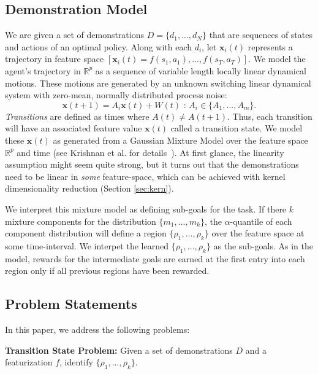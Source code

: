 \subsection{Demonstration Model}
We are given a set of demonstrations $D=\{d_1,...,d_N\}$ that are sequences of states and actions of an optimal policy.
Along with each $d_i$, let $\mathbf{x}_i(t)$ represents a trajectory in feature space $[\mathbf{x}_i(t)= f(s_1,a_1),...,f(s_T,a_T)]$.
We model the agent's trajectory in $\mathbb{R}^p$ as a sequence of variable length locally linear dynamical motions.
These motions are generated by an unknown switching linear dynamical system with zero-mean, normally distributed process noise:
\[
\mathbf{x}(t+1) = A_{i}\mathbf{x}(t) + W(t) \text{ : } A_i \in \{A_1,...,A_m\}.
\]
\emph{Transitions} are defined as times where $A(t) \ne A(t+1)$.
Thus, each transition will have an associated feature value $\mathbf{x}(t)$ called a transition state.
We model these $\mathbf{x}(t)$ as generated from a Gaussian Mixture Model over the feature space $\mathbb{R}^p$ and time (see Krishnan et al. for details~\cite{krishnan2015tsc}).
At first glance, the linearity assumption might seem quite strong, but it turns out that the demonstrations need to be linear in \emph{some} feature-space, which can be achieved with kernel dimensionality reduction (Section \ref{sec:kern}).
 
We interpret this mixture model as defining sub-goals for the task.
If there $k$ mixture components for the distribution $\{m_1,...,m_k\}$, the $\alpha$-quantile of each component distribution will define a region $\{\rho_1,...,\rho_k\}$ over the feature space at some time-interval.
We interpet the learned $\{\rho_1,...,\rho_k\}$ as the sub-goals.
As in the model, rewards for the intermediate goals are earned at the first entry into each region only if all previous regions have been rewarded.

\subsection{Problem Statements}
In this paper, we address the following problems:

\vspace{0.5em}

\noindent\textbf{Transition State Problem: } Given a set of demonstrations $D$ and a featurization $f$, identify $\{\rho_1,...,\rho_k\}$.

\vspace{0.5em}

